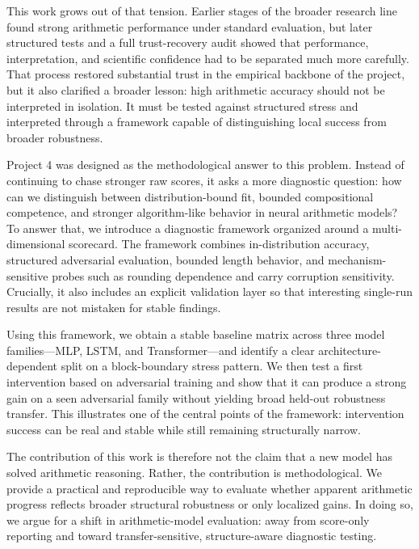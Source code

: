 \documentclass[11pt]{article}
\begin{document}
This work grows out of that tension. Earlier stages of the broader research line found strong arithmetic performance under standard evaluation, but later structured tests and a full trust-recovery audit showed that performance, interpretation, and scientific confidence had to be separated much more carefully. That process restored substantial trust in the empirical backbone of the project, but it also clarified a broader lesson: high arithmetic accuracy should not be interpreted in isolation. It must be tested against structured stress and interpreted through a framework capable of distinguishing local success from broader robustness.

Project 4 was designed as the methodological answer to this problem. Instead of continuing to chase stronger raw scores, it asks a more diagnostic question: how can we distinguish between distribution-bound fit, bounded compositional competence, and stronger algorithm-like behavior in neural arithmetic models? To answer that, we introduce a diagnostic framework organized around a multi-dimensional scorecard. The framework combines in-distribution accuracy, structured adversarial evaluation, bounded length behavior, and mechanism-sensitive probes such as rounding dependence and carry corruption sensitivity. Crucially, it also includes an explicit validation layer so that interesting single-run results are not mistaken for stable findings.

Using this framework, we obtain a stable baseline matrix across three model families—MLP, LSTM, and Transformer—and identify a clear architecture-dependent split on a block-boundary stress pattern. We then test a first intervention based on adversarial training and show that it can produce a strong gain on a seen adversarial family without yielding broad held-out robustness transfer. This illustrates one of the central points of the framework: intervention success can be real and stable while still remaining structurally narrow.

The contribution of this work is therefore not the claim that a new model has solved arithmetic reasoning. Rather, the contribution is methodological. We provide a practical and reproducible way to evaluate whether apparent arithmetic progress reflects broader structural robustness or only localized gains. In doing so, we argue for a shift in arithmetic-model evaluation: away from score-only reporting and toward transfer-sensitive, structure-aware diagnostic testing.
\end{document}

